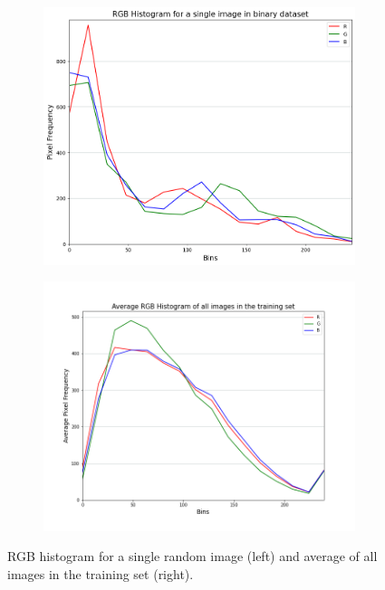 \documentclass[letterpaper,12pt]{article}
\begin{document}
\begin{figure}[h]
\centering
\begin{subfigure}{.41\textwidth}
  \centering
  \includegraphics[width=\textwidth]{results/rgb_hist_single_image_binary.png}
  \label{fig:rgb_hist_single_image_binary}
\end{subfigure}%
\begin{subfigure}{.5\textwidth}
  \centering
  \includegraphics[width=\textwidth]{jupyter prototyping/rgb_avg_hist_all_training_set.png}
  \label{fig:rgb_avg_hist_all_training_set}
\end{subfigure}
\caption{\label{fig:rgb-hists}RGB histogram for a single random image (left) and average of all images in the training set (right).}
\end{figure}
\end{document}
